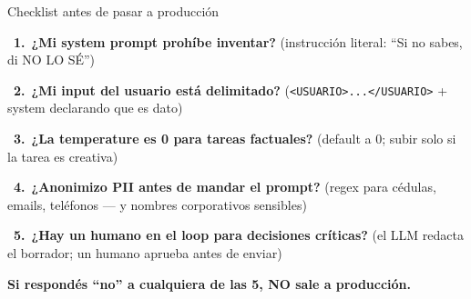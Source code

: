 \documentclass[aspectratio=169, 11pt]{beamer}
\begin{document}
\begin{frame}[shrink]{Checklist antes de pasar a producción}
  \vspace{8pt}
  {\footnotesize
  \faCheckSquare~\textbf{1.}~\textbf{¿Mi system prompt prohíbe inventar?}
  (instrucción literal: ``Si no sabes, di NO LO SÉ'')\par\vspace{7pt}
  \faCheckSquare~\textbf{2.}~\textbf{¿Mi input del usuario está delimitado?}
  (\texttt{<USUARIO>...</USUARIO>} + system declarando que es dato)\par\vspace{7pt}
  \faCheckSquare~\textbf{3.}~\textbf{¿La temperature es 0 para tareas factuales?}
  (default a 0; subir solo si la tarea es creativa)\par\vspace{7pt}
  \faCheckSquare~\textbf{4.}~\textbf{¿Anonimizo PII antes de mandar el prompt?}
  (regex para cédulas, emails, teléfonos --- y nombres corporativos sensibles)\par\vspace{7pt}
  \faCheckSquare~\textbf{5.}~\textbf{¿Hay un humano en el loop para decisiones críticas?}
  (el LLM redacta el borrador; un humano aprueba antes de enviar)\par}
  \vspace{4pt}
  \begin{tcolorbox}[colback=arcaRed!8, colframe=arcaRed, leftrule=3pt,
    boxrule=0pt, sharp corners, left=8pt, right=8pt, top=3pt, bottom=3pt]
    {\footnotesize\color{arcaDark}\bfseries
    Si respondés ``no'' a cualquiera de las 5, NO sale a producción.}
  \end{tcolorbox}
\end{frame}
\end{document}
